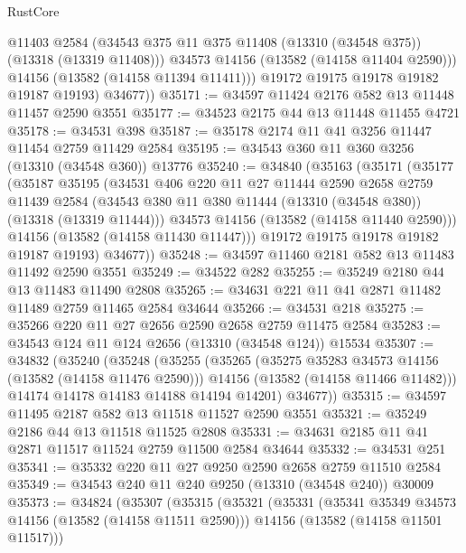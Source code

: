 \begin{lexlean}{RustCore}
\begin{coremodule}
              @11403
              @2584
              (@34543 @375 @11 @375 @11408 (@13310 (@34548 @375)) (@13318 (@13319 @11408)))
              @34573
              @14156
              (@13582 (@14158 @11404 @2590)))
            @14156
            (@13582 (@14158 @11394 @11411)))
          @19172
          @19175
          @19178
          @19182
          @19187
          @19193)
        @34677))
@35171 := @34597 @11424 @2176 @582 @13 @11448 @11457 @2590 @3551
@35177 := @34523 @2175 @44 @13 @11448 @11455 @4721
@35178 := @34531 @398
@35187 := @35178 @2174 @11 @41 @3256 @11447 @11454 @2759 @11429 @2584
@35195 := @34543 @360 @11 @360 @3256 (@13310 (@34548 @360)) @13776
@35240 := @34840
    (@35163
      (@35171
        (@35177
          (@35187
            @35195
            (@34531
              @406
              @220
              @11
              @27
              @11444
              @2590
              @2658
              @2759
              @11439
              @2584
              (@34543 @380 @11 @380 @11444 (@13310 (@34548 @380)) (@13318 (@13319 @11444)))
              @34573
              @14156
              (@13582 (@14158 @11440 @2590)))
            @14156
            (@13582 (@14158 @11430 @11447)))
          @19172
          @19175
          @19178
          @19182
          @19187
          @19193)
        @34677))
@35248 := @34597 @11460 @2181 @582 @13 @11483 @11492 @2590 @3551
@35249 := @34522 @282
@35255 := @35249 @2180 @44 @13 @11483 @11490 @2808
@35265 := @34631 @221 @11 @41 @2871 @11482 @11489 @2759 @11465 @2584 @34644
@35266 := @34531 @218
@35275 := @35266 @220 @11 @27 @2656 @2590 @2658 @2759 @11475 @2584
@35283 := @34543 @124 @11 @124 @2656 (@13310 (@34548 @124)) @15534
@35307 := @34832
    (@35240
      (@35248
        (@35255
          (@35265
            (@35275 @35283 @34573 @14156 (@13582 (@14158 @11476 @2590)))
            @14156
            (@13582 (@14158 @11466 @11482)))
          @14174
          @14178
          @14183
          @14188
          @14194
          @14201)
        @34677))
@35315 := @34597 @11495 @2187 @582 @13 @11518 @11527 @2590 @3551
@35321 := @35249 @2186 @44 @13 @11518 @11525 @2808
@35331 := @34631 @2185 @11 @41 @2871 @11517 @11524 @2759 @11500 @2584 @34644
@35332 := @34531 @251
@35341 := @35332 @220 @11 @27 @9250 @2590 @2658 @2759 @11510 @2584
@35349 := @34543 @240 @11 @240 @9250 (@13310 (@34548 @240)) @30009
@35373 := @34824
    (@35307
      (@35315
        (@35321
          (@35331
            (@35341 @35349 @34573 @14156 (@13582 (@14158 @11511 @2590)))
            @14156
            (@13582 (@14158 @11501 @11517)))

\end{coremodule}
\end{lexlean}
